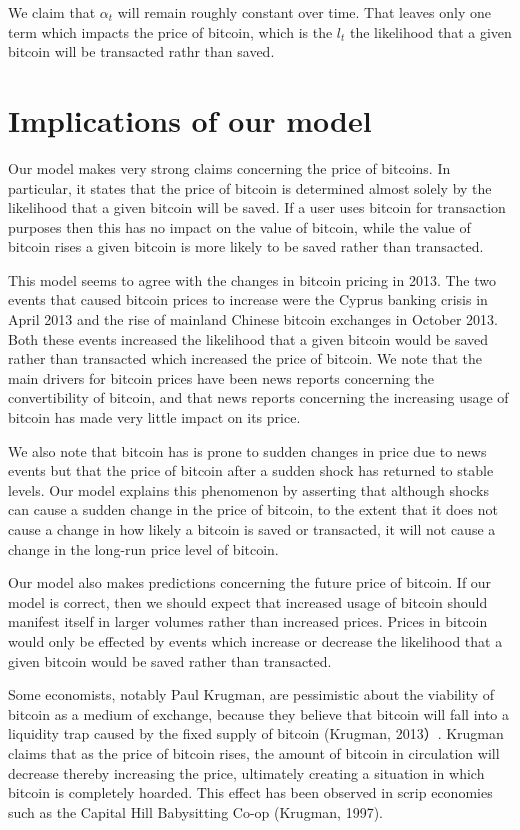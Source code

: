We claim that $\alpha_t$ will remain roughly constant over time.  That
leaves only one term which impacts the price of bitcoin, which is the
$l_t$ the likelihood that a given bitcoin will be transacted rathr
than saved.

\section{Implications of our model}
Our model makes very strong claims concerning the price of bitcoins.
In particular, it states that the price of bitcoin is determined
almost solely by the likelihood that a given bitcoin will be saved. If
a user uses bitcoin for transaction purposes then this has no impact
on the value of bitcoin, while the value of bitcoin rises a given
bitcoin is more likely to be saved rather than transacted.

This model seems to agree with the changes in bitcoin pricing in 2013.
The two events that caused bitcoin prices to increase were the Cyprus
banking crisis in April 2013 and the rise of mainland Chinese bitcoin
exchanges in October 2013.  Both these events increased the likelihood
that a given bitcoin would be saved rather than transacted which
increased the price of bitcoin.  We note that the main drivers for
bitcoin prices have been news reports concerning the convertibility of
bitcoin, and that news reports concerning the increasing usage of
bitcoin has made very little impact on its price.

We also note that bitcoin has is prone to sudden changes in price due
to news events but that the price of bitcoin after a sudden shock has
returned to stable levels.  Our model explains this phenomenon by
asserting that although shocks can cause a sudden change in the price
of bitcoin, to the extent that it does not cause a change in how
likely a bitcoin is saved or transacted, it will not cause a change in
the long-run price level of bitcoin.

Our model also makes predictions concerning the future price of
bitcoin.  If our model is correct, then we should expect that
increased usage of bitcoin should manifest itself in larger volumes
rather than increased prices.  Prices in bitcoin would only be
effected by events which increase or decrease the likelihood that a
given bitcoin would be saved rather than transacted.

Some economists, notably Paul Krugman, are pessimistic about the
viability of bitcoin as a medium of exchange, because they believe
that bitcoin will fall into a liquidity trap caused by the fixed
supply of bitcoin (Krugman, 2013）.  Krugman claims that as the price
of bitcoin rises, the amount of bitcoin in circulation will decrease
thereby increasing the price, ultimately creating a situation in
which bitcoin is completely hoarded.  This effect has been observed
in scrip economies such as the Capital Hill Babysitting Co-op
(Krugman, 1997).

